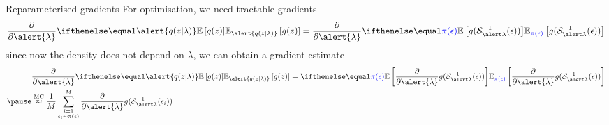 \documentclass[14pt,dvipsnames]{beamer}
\begin{document}
\begin{frame}{Reparameterised gradients}
	For optimisation, we need tractable gradients
	\begin{equation*}
		\begin{aligned}
			\pdv{\alert{\lambda}}  \E[\alert{q(z|\lambda)}]{g(z)} = \pdv{\alert{\lambda}} \E[\textcolor{blue}{\pi(\epsilon)}]{g(\inv{\mathcal S}_{\alert\lambda}(\epsilon)) }
		\end{aligned}
	\end{equation*} \pause
	since now the density does not depend on $\lambda$, we can obtain a gradient estimate
	\begin{equation*}
		\begin{aligned}
			&\pdv{\alert{\lambda}}  \E[\alert{q(z|\lambda)}]{g(z)} =  \E[\textcolor{blue}{\pi(\epsilon)}]{\pdv{\alert{\lambda}} g(\inv{\mathcal S}_{\alert\lambda}(\epsilon)) } \\ \pause
			&\overset{\text{MC}}{\approx}  \frac{1}{M} \sum_{\substack{i=1\\ \epsilon_i \sim \pi(\epsilon)}}^M \pdv{\alert{\lambda}} g(\inv{\mathcal S}_{\alert\lambda}(\epsilon_i)) 
		\end{aligned}
	\end{equation*}
\end{frame}

\end{document}

